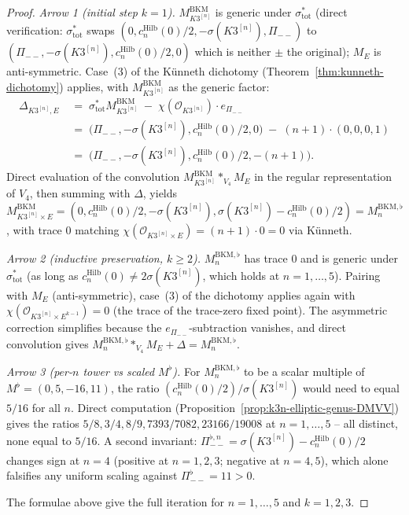 \begin{proof}[Proof]
\textit{Arrow 1 \textup{(}initial step $k = 1$\textup{).}}
$M^{\mathrm{BKM}}_{K3^{[n]}}$ is generic under $\sigma_{\mathrm{tot}}^*$
\textup{(}direct verification: $\sigma_{\mathrm{tot}}^*$ swaps
$(0, c_n^{\mathrm{Hilb}}(0)/2, -\sigma(K3^{[n]}), \Pi_{--})$
to $(\Pi_{--}, -\sigma(K3^{[n]}), c_n^{\mathrm{Hilb}}(0)/2, 0)$ which is
neither $\pm$ the original\textup{);} $M_E$ is anti-symmetric. Case~(3)
of the K\"unneth dichotomy
\textup{(}Theorem~\ref{thm:kunneth-dichotomy}\textup{)} applies, with
$M^{\mathrm{BKM}}_{K3^{[n]}}$ as the generic factor:
\begin{align*}
 \Delta_{K3^{[n]}, E}
 &\;=\; \sigma_{\mathrm{tot}}^* M^{\mathrm{BKM}}_{K3^{[n]}}
 \;-\; \chi(\mathcal{O}_{K3^{[n]}}) \cdot e_{\Pi_{--}} \\
 &\;=\; \bigl(\Pi_{--}, -\sigma(K3^{[n]}), c_n^{\mathrm{Hilb}}(0)/2, 0\bigr)
 \;-\; (n + 1) \cdot (0, 0, 0, 1) \\
 &\;=\; \bigl(\Pi_{--}, -\sigma(K3^{[n]}), c_n^{\mathrm{Hilb}}(0)/2, -(n + 1)\bigr).
\end{align*}
Direct evaluation of the convolution
$M^{\mathrm{BKM}}_{K3^{[n]}} *_{V_4} M_E$ in the regular representation
of $V_4$, then summing with $\Delta$, yields
$M^{\mathrm{BKM}}_{K3^{[n]} \times E}
 = (0, c_n^{\mathrm{Hilb}}(0)/2, -\sigma(K3^{[n]}),
 \sigma(K3^{[n]}) - c_n^{\mathrm{Hilb}}(0)/2)
 = M^{\mathrm{BKM}, \flat}_n$, with trace $0$ matching
$\chi(\mathcal{O}_{K3^{[n]} \times E}) = (n + 1) \cdot 0 = 0$ via
K\"unneth.

\textit{Arrow 2 \textup{(}inductive preservation, $k \geq 2$\textup{).}}
$M^{\mathrm{BKM}, \flat}_n$ has trace $0$ and is generic under
$\sigma_{\mathrm{tot}}^*$
\textup{(}as long as $c_n^{\mathrm{Hilb}}(0) \neq 2 \sigma(K3^{[n]})$,
which holds at $n = 1, \ldots, 5$\textup{).} Pairing with $M_E$
\textup{(}anti-symmetric\textup{),} case~(3) of the dichotomy applies
again with $\chi(\mathcal{O}_{K3^{[n]} \times E^{k - 1}}) = 0$
\textup{(}the trace of the trace-zero fixed point\textup{).}
The asymmetric correction simplifies because the
$e_{\Pi_{--}}$-subtraction vanishes, and direct convolution gives
$M^{\mathrm{BKM}, \flat}_n *_{V_4} M_E + \Delta = M^{\mathrm{BKM}, \flat}_n$.

\textit{Arrow 3 \textup{(}per-$n$ tower vs scaled $M^{\flat}$\textup{).}}
For $M^{\mathrm{BKM}, \flat}_n$ to be a scalar multiple of
$M^{\flat} = (0, 5, -16, 11)$, the ratio
$(c_n^{\mathrm{Hilb}}(0) / 2) / \sigma(K3^{[n]})$ would need to equal
$5 / 16$ for all $n$. Direct computation
\textup{(}Proposition~\ref{prop:k3n-elliptic-genus-DMVV}\textup{)}
gives the ratios $5/8, 3/4, 8/9, 7393/7082, 23166/19008$ at
$n = 1, \ldots, 5$ -- all distinct, none equal to $5/16$.
A second invariant: $\Pi_{--}^{\flat, n} = \sigma(K3^{[n]})
- c_n^{\mathrm{Hilb}}(0)/2$ changes sign at $n = 4$
\textup{(}positive at $n = 1, 2, 3$; negative at $n = 4, 5$\textup{),}
which alone falsifies any uniform scaling against
$\Pi_{--}^{\flat} = 11 > 0$.

The formulae above give the full iteration for
$n = 1, \ldots, 5$ and $k = 1,2,3$.
\end{proof}

